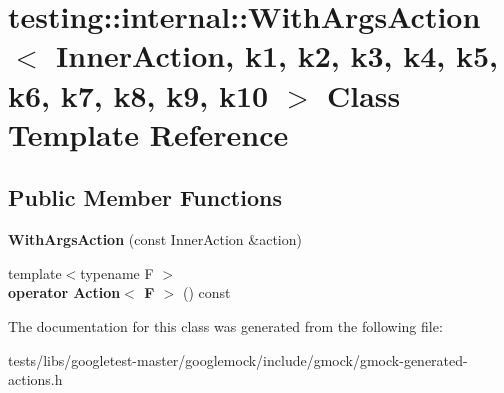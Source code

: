 \hypertarget{classtesting_1_1internal_1_1WithArgsAction}{}\section{testing\+:\+:internal\+:\+:With\+Args\+Action$<$ Inner\+Action, k1, k2, k3, k4, k5, k6, k7, k8, k9, k10 $>$ Class Template Reference}
\label{classtesting_1_1internal_1_1WithArgsAction}
\subsection*{Public Member Functions}
\begin{DoxyCompactItemize}
\item 
\mbox{\label{classtesting_1_1internal_1_1WithArgsAction_ab408f9c56c8f25564ef554b984e1c926}} 
{\bfseries With\+Args\+Action} (const Inner\+Action \&action)
\item 
\mbox{\label{classtesting_1_1internal_1_1WithArgsAction_ab6d8f89fd5a54f2914da2523b2ba6ee5}} 
{\footnotesize template$<$typename F $>$ }\\{\bfseries operator Action$<$ F $>$} () const
\end{DoxyCompactItemize}


The documentation for this class was generated from the following file\+:\begin{DoxyCompactItemize}
\item 
tests/libs/googletest-\/master/googlemock/include/gmock/gmock-\/generated-\/actions.\+h\end{DoxyCompactItemize}
